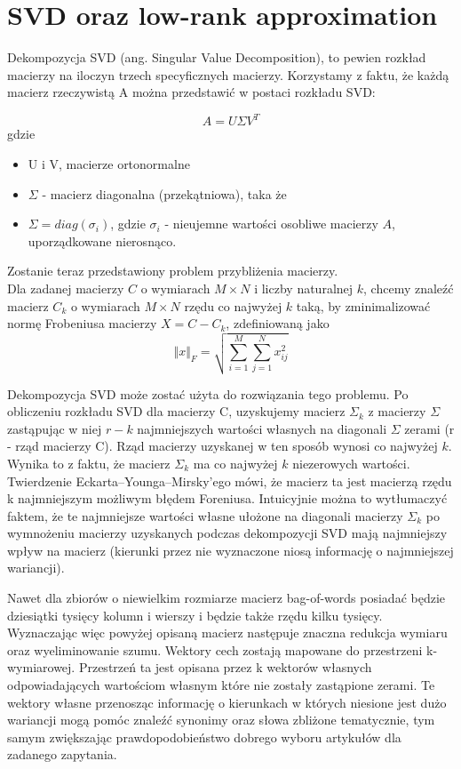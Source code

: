 \section{SVD oraz low-rank approximation}
Dekompozycja SVD (ang. Singular Value Decomposition), to pewien rozkład macierzy na iloczyn trzech specyficznych macierzy. Korzystamy z faktu, że każdą macierz rzeczywistą A można przedstawić w postaci rozkładu SVD:

$$A=U\Sigma V ^T$$
gdzie
\begin{itemize}
\item U i V, macierze ortonormalne
\item $\Sigma$ -  macierz diagonalna (przekątniowa), taka że 
\item $\Sigma=diag(\sigma_i)$, gdzie $\sigma_i$ - nieujemne wartości osobliwe macierzy $A$, uporządkowane nierosnąco. 
\end{itemize}

Zostanie teraz przedstawiony problem przybliżenia macierzy.\\
Dla zadanej macierzy $C$ o wymiarach $M \times N$ i liczby naturalnej $k$, chcemy znaleźć macierz $C_k$ o wymiarach $M \times N$ rzędu co najwyżej $k$ taką, by zminimalizować normę Frobeniusa macierzy $X = C - C_k$, zdefiniowaną jako
$$\Vert x \Vert _{F} =\sqrt{ \sum \limits _{i=1}^{M} \sum \limits _{j=1}^{N} x^{2}_{ij}} $$

Dekompozycja SVD może zostać użyta do rozwiązania tego problemu. Po obliczeniu rozkładu SVD dla macierzy C, uzyskujemy macierz $\Sigma _k$ z macierzy $\Sigma$ zastąpując w niej $r-k$ najmniejszych wartości własnych na diagonali $\Sigma$ zerami (r - rząd macierzy C). Rząd macierzy uzyskanej w ten sposób wynosi co najwyżej $k$. Wynika to z faktu, że macierz $\Sigma _k$ ma co najwyżej $k$ niezerowych wartości.
Twierdzenie Eckarta–Younga–Mirsky'ego mówi, że macierz ta jest macierzą rzędu k najmniejszym możliwym błędem Foreniusa. Intuicyjnie można to wytłumaczyć faktem, że te najmniejsze wartości własne ułożone na diagonali macierzy $\Sigma _k$ po wymnożeniu macierzy uzyskanych podczas dekompozycji SVD mają najmniejszy wpływ na macierz (kierunki przez nie wyznaczone niosą informację o najmniejszej wariancji).

Nawet dla zbiorów o niewielkim rozmiarze macierz bag-of-words posiadać będzie dziesiątki tysięcy kolumn i wierszy i będzie także rzędu kilku tysięcy. Wyznaczając więc powyżej opisaną macierz następuje znaczna redukcja wymiaru oraz wyeliminowanie szumu. Wektory cech zostają mapowane do przestrzeni k-wymiarowej. Przestrzeń ta jest opisana przez k wektorów własnych odpowiadających wartościom własnym które nie zostały zastąpione zerami. Te wektory własne przenosząc informację o kierunkach w których niesione jest dużo wariancji mogą pomóc znaleźć synonimy oraz słowa zbliżone tematycznie, tym samym zwiększając prawdopodobieństwo dobrego wyboru artykułów dla zadanego zapytania.



